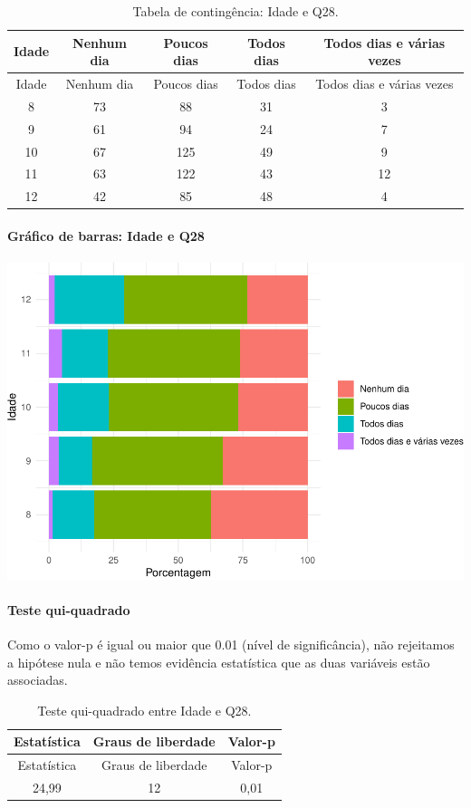 \documentclass[]{article}
\let\oldparagraph\paragraph
\renewcommand{\paragraph}[1]{\oldparagraph{#1}\mbox{}}
\begin{document}
\begin{longtable}[]{@{}ccccc@{}}
\caption{\label{tab:unnamed-chunk-858}Tabela de contingência: Idade e Q28.}\tabularnewline
\toprule
Idade & Nenhum dia & Poucos dias & Todos dias & Todos dias e várias vezes\tabularnewline
\midrule
\endfirsthead
\toprule
Idade & Nenhum dia & Poucos dias & Todos dias & Todos dias e várias vezes\tabularnewline
\midrule
\endhead
8 & 73 & 88 & 31 & 3\tabularnewline
9 & 61 & 94 & 24 & 7\tabularnewline
10 & 67 & 125 & 49 & 9\tabularnewline
11 & 63 & 122 & 43 & 12\tabularnewline
12 & 42 & 85 & 48 & 4\tabularnewline
\bottomrule
\end{longtable}

\hypertarget{gruxe1fico-de-barras-idade-e-q28}{%
\paragraph{Gráfico de barras: Idade e Q28}\label{gruxe1fico-de-barras-idade-e-q28}}

\begin{center}\includegraphics[width=0.75\linewidth]{relatorio_covid19_files/figure-latex/unnamed-chunk-859-1} \end{center}

\hypertarget{teste-qui-quadrado-74}{%
\paragraph{Teste qui-quadrado}\label{teste-qui-quadrado-74}}

Como o valor-p é igual ou maior que 0.01 (nível de significância), não rejeitamos a hipótese nula e não temos evidência estatística que as duas variáveis estão associadas.

\begin{longtable}[]{@{}ccc@{}}
\caption{\label{tab:unnamed-chunk-861}Teste qui-quadrado entre Idade e Q28.}\tabularnewline
\toprule
Estatística & Graus de liberdade & Valor-p\tabularnewline
\midrule
\endfirsthead
\toprule
Estatística & Graus de liberdade & Valor-p\tabularnewline
\midrule
\endhead
24,99 & 12 & 0,01\tabularnewline
\bottomrule
\end{longtable}
\end{document}
